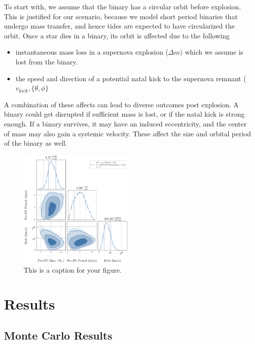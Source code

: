 \documentclass[linenumbers,trackchanges,twocolumn]{aastex701}
\begin{document}
To start with, we assume that the binary has a circular orbit before explosion. This is justified for our scenario, because we model short period binaries that undergo mass transfer, and hence tides are expected to have circularized the orbit. Once a star dies in a binary, its orbit is affected due to the following

\begin{itemize}
    \item instantaneous mass loss in a supernova explosion ($\Delta m)$ which we assume is lost from the binary. 
    \item the speed and direction of a potential natal kick to the supernova remnant ($v_{kick}, \{\theta,\phi\}$
\end{itemize}

A combination of these affects can lead to diverse outcomes post explosion. A binary could get disrupted if sufficient mass is lost, or if the natal kick is strong enough. If a binary survives, it may have an induced eccentricity, and the center of mass may also gain a systemic velocity. These affect the size and orbital period of the binary as well. 

\begin{figure}[htbp]
    \centering
    \includegraphics[width=0.5\textwidth]{xrb-monte-carlo-mass-period-kick.pdf}
    \caption{This is a caption for your figure.}
    \label{fig:xrb_monte_carlo}
\end{figure}

\section{Results}

\subsection{Monte Carlo Results}
\end{document}
